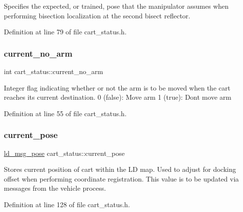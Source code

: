 Specifies the expected, or trained, pose that the manipulator assumes when performing bisection localization at the second bisect reflector. 

Definition at line 79 of file cart\+\_\+status.\+h.

\mbox{\label{classcart__status_ad458c08316b2199cbfbe0e1186585432}} 
\subsubsection{\texorpdfstring{current\+\_\+no\+\_\+arm}{current\_no\_arm}}
{\footnotesize\ttfamily int cart\+\_\+status\+::current\+\_\+no\+\_\+arm\hspace{0.3cm}{\ttfamily [private]}}

Integer flag indicating whether or not the arm is to be moved when the cart reaches it\textquotesingle{}s current destination. 0 (false)\+: Move arm 1 (true)\+: Don\textquotesingle{}t move arm 

Definition at line 55 of file cart\+\_\+status.\+h.

\mbox{\label{classcart__status_a5fe1250a34605ce2bea020047eb71223}} 
\subsubsection{\texorpdfstring{current\+\_\+pose}{current\_pose}}
{\footnotesize\ttfamily \mbox{\hyperlink{structld__msg__pose}{ld\+\_\+msg\+\_\+pose}} cart\+\_\+status\+::current\+\_\+pose\hspace{0.3cm}{\ttfamily [private]}}

Stores current position of cart within the LD map. Used to adjust for docking offset when performing coordinate registration. This value is to be updated via messages from the vehicle process. 

Definition at line 128 of file cart\+\_\+status.\+h.

\mbox{\label{classcart__status_a8f3151213022c1aab59d0c0dae5e4b4c}} 
